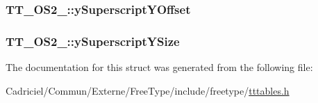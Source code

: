 \hypertarget{struct_t_t___o_s2___ab425c51eaf29a0ec441ec57439003c01}{
\subsubsection[{y\-Superscript\-Y\-Offset}]{ T\-T\-\_\-\-O\-S2\-\_\-\-::y\-Superscript\-Y\-Offset}}\label{struct_t_t___o_s2___ab425c51eaf29a0ec441ec57439003c01}
\hypertarget{struct_t_t___o_s2___a272867f1270ddca538b082d190715012}{
\subsubsection[{y\-Superscript\-Y\-Size}]{ T\-T\-\_\-\-O\-S2\-\_\-\-::y\-Superscript\-Y\-Size}}\label{struct_t_t___o_s2___a272867f1270ddca538b082d190715012}


The documentation for this struct was generated from the following file\-:\begin{DoxyCompactItemize}
\item 
Cadriciel/\-Commun/\-Externe/\-Free\-Type/include/freetype/\hyperlink{tttables_8h}{tttables.\-h}\end{DoxyCompactItemize}
